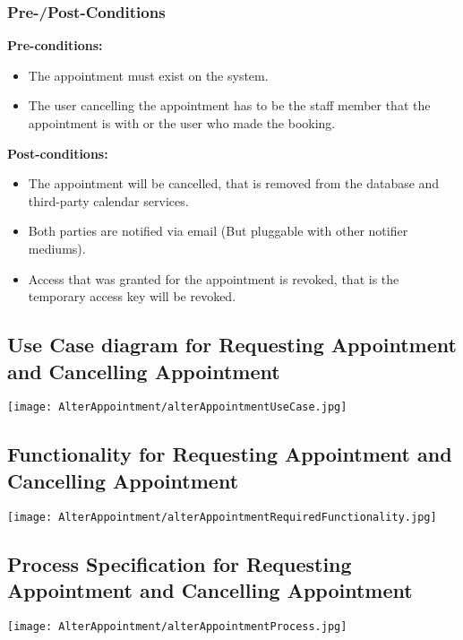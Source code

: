 \subsubsection{Pre-/Post-Conditions}
\textbf{Pre-conditions:} 
	\begin{itemize}
		\item The appointment must exist on the system.
		\item The user cancelling the appointment has to be the staff member that the appointment is with or the user who made the booking.
	\end{itemize}
\textbf{Post-conditions:} 
	\begin{itemize}
		\item The appointment will be cancelled, that is removed from the database and third-party calendar services.
		\item  Both parties are notified via email (But pluggable with other notifier mediums).
		\item Access that was granted for the appointment is revoked, that is the temporary access key will be revoked. 
	\end{itemize}

\subsection{Use Case diagram for Requesting Appointment and Cancelling Appointment}
	\texttt{[image: AlterAppointment/alterAppointmentUseCase.jpg]}
	
\subsection{Functionality for Requesting Appointment and Cancelling Appointment}
	\texttt{[image: AlterAppointment/alterAppointmentRequiredFunctionality.jpg]}
	
\subsection{Process Specification for Requesting Appointment and Cancelling Appointment}
	\texttt{[image: AlterAppointment/alterAppointmentProcess.jpg]}

